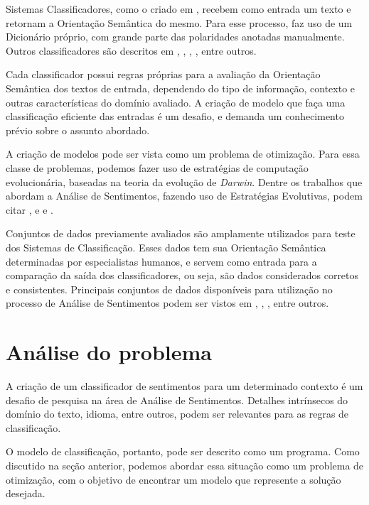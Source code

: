 \documentclass[12pt]{article}
\begin{document}
Sistemas Classificadores, como o criado em \cite{Rodrigues2016}, recebem como entrada um texto e retornam a Orientação Semântica do mesmo. Para esse processo, \cite{Rodrigues2016} faz uso de um Dicionário próprio, com grande parte das polaridades anotadas manualmente. Outros classificadores são descritos em \cite{Pang2002}, \cite{Zhou2014}, \cite{silva2010automatic}, \cite{kdir16}, entre outros.

Cada classificador possui regras próprias para a avaliação da Orientação Semântica dos textos de entrada, dependendo do tipo de informação, contexto e outras características do domínio avaliado. A criação de modelo que faça uma classificação eficiente das entradas é um desafio, e demanda um conhecimento prévio sobre o assunto abordado. 

A criação de modelos pode ser vista como um problema de otimização. Para essa classe de problemas, podemos fazer uso de estratégias de computação evolucionária, baseadas na teoria da evolução de \emph{Darwin}. Dentre os trabalhos que abordam a Análise de Sentimentos, fazendo uso de Estratégias Evolutivas, podem citar \cite{ferreira2015using}, \cite{vohra2013comparative} e \cite{HADDI2013} e \cite{silveirageraccao}.

Conjuntos de dados previamente avaliados são amplamente utilizados para teste dos Sistemas de Classificação. Esses dados tem sua Orientação Semântica determinadas por especialistas humanos, e servem como entrada para a comparação da saída dos classificadores, ou seja, são dados considerados corretos e consistentes. Principais conjuntos de dados disponíveis para utilização no processo de Análise de Sentimentos podem ser vistos em \cite{HuAndLiu2004}, \cite{Iqbal}, \cite{taboada2011lexicon}, entre outros. 

\section{Análise do problema}

A criação de um classificador de sentimentos para um determinado contexto é um desafio de pesquisa na área de Análise de Sentimentos. Detalhes intrínsecos do domínio do texto, idioma, entre outros, podem ser relevantes para as regras de classificação. 

O modelo de classificação, portanto, pode ser descrito como um programa. Como discutido na seção anterior, podemos abordar essa situação como um problema de otimização, com o objetivo de encontrar um modelo que represente a solução desejada.
\end{document}
